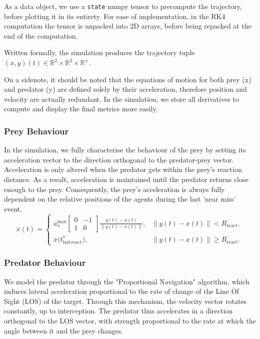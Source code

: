 \documentclass[11pt]{article}
\begin{document}
        As a data object, we use a \texttt{state} numpy tensor to precompute the trajectory, before plotting it in its entirety. For ease of implementation, in the RK4 computation the tensor is unpacked into 2D arrays, before being repacked at the end of the computation.

        Written formally, the simulation produces the trajectory tuple $(x,y)(t)\in \mathbb{R}^2 \times \mathbb{R}^2 \times \mathbb{R}^+$.

        On a sidenote, it should be noted that the equations of motion for both prey (x) and predator (y) are defined solely by their acceleration, therefore position and velocity are actually redundant. In the simulation, we store all derivatives to compute and display the final metrics more easily.

        \subsubsection{Prey Behaviour}
        In the simulation, we fully characterise the behaviour of the prey by setting its acceleration vector to the direction orthogonal to the predator-prey vector. Acceleration is only altered when the predator gets within the prey's reaction distance. As a result, acceleration is maintained until the predator returns close enough to the prey. Consequently, the prey's acceleration is always fully dependent on the relative positions of the agents during the last 'near miss' event.
        \[
          \ddot{x}(t) =
          \begin{cases}
            a_x^{\max}
            \begin{bmatrix}
              0 & -1\\
              1 & 0
            \end{bmatrix}
            \displaystyle\frac{y(t) - x(t)}{\|y(t) - x(t)\|},
            & \|y(t) - x(t)\| < R_{\mathrm{react}},\\[1.2em]
            \ddot{x}\bigl(t^*_{\mathrm{last\,react}}\bigr),
            & \|y(t) - x(t)\| \ge R_{\mathrm{react}}.
          \end{cases}
        \]

        \subsubsection{Predator Behaviour}
        We model the predator through the "Proportional Navigation" algorithm, which induces lateral acceleration proportional to the rate of change of the Line Of Sight (LOS) of the target. Through this mechanism, the velocity vector rotates constantly, up to interception. The predator thus accelerates in a direction orthogonal to the LOS vector, with strength proportional to the rate at which the angle between it and the prey changes.
\end{document}
